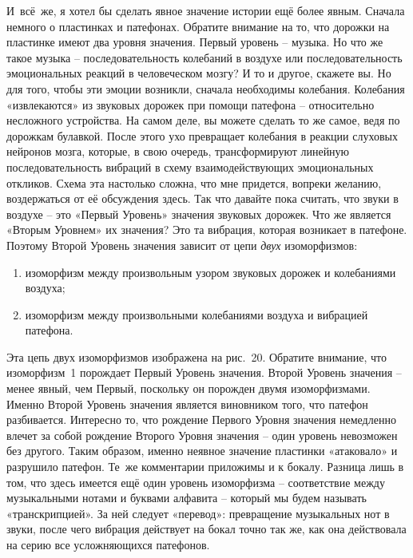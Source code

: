 \documentclass[../main.tex]{subfiles}
\begin{document}
И~всё~же, я хотел бы сделать явное значение истории ещё более явным. Сначала немного о пластинках и патефонах. Обратите внимание на то, что дорожки на пластинке имеют два уровня значения. Первый уровень \--- музыка. Но что же такое музыка \--- последовательность колебаний в воздухе или последовательность эмоциональных реакций в человеческом мозгу? И то и другое, скажете вы. Но для того, чтобы эти эмоции возникли, сначала необходимы колебания. Колебания «извлекаются» из звуковых дорожек при помощи патефона \--- относительно несложного устройства. На самом деле, вы можете сделать то же самое, ведя по дорожкам булавкой. После этого ухо превращает колебания в реакции слуховых нейронов мозга, которые, в свою очередь, трансформируют линейную последовательность вибраций в схему взаимодействующих эмоциональных откликов. Схема эта настолько сложна, что мне придется, вопреки желанию, воздержаться от её обсуждения здесь. Так что давайте пока считать, что звуки в воздухе \--- это «Первый Уровень» значения звуковых дорожек. Что же является «Вторым Уровнем» их значения? Это та вибрация, которая возникает в патефоне. Поэтому Второй Уровень значения зависит от цепи \emph{двух} изоморфизмов:
%
\begin{enumerate}[label=(\arabic*), noitemsep, topsep=6pt]
    \item изоморфизм между произвольным узором звуковых дорожек и колебаниями воздуха;
    \item изоморфизм между произвольными колебаниями воздуха и вибрацией патефона.
\end{enumerate}

Эта цепь двух изоморфизмов изображена на рис.~20. Обратите внимание, что изоморфизм~1 порождает Первый Уровень значения. Второй Уровень значения \--- менее явный, чем Первый, поскольку он порожден двумя изоморфизмами. Именно Второй Уровень значения является виновником того, что патефон разбивается. Интересно то, что рождение Первого Уровня значения немедленно влечет за собой рождение Второго Уровня значения \--- один уровень невозможен без другого. Таким образом, именно неявное значение пластинки «атаковало» и разрушило патефон. Те~же комментарии приложимы и к бокалу. Разница лишь в том, что здесь имеется ещё один уровень изоморфизма \--- соответствие между музыкальными нотами и буквами алфавита \--- который мы будем называть «транскрипцией». За ней следует «перевод»: превращение музыкальных нот в звуки, после чего вибрация действует на бокал точно так же, как она действовала на серию все усложняющихся патефонов.
\end{document}
